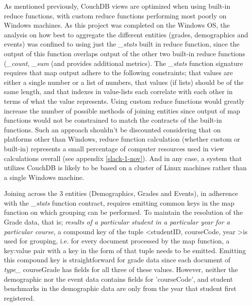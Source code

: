 As mentioned previously, CouchDB views are optimized when using built-in reduce functions, with custom reduce functions performing most poorly on Windows machines. As this project was completed on the Windows OS, the analysis on how best to aggregate the different entities (grades, demographics and events) was confined to using just the \textit{\_stats} built in reduce function, since the output of this function overlaps output of the other two built-in reduce functions (\textit{\_count}, \textit{\_sum} (and provides additional metrics). The \textit{\_stats} function signature requires that map output adhere to the following constraints; that values are either a single number or a list of numbers, that values (if lists) should be of the same length, and that indexes in value-lists each correlate with each other in terms of what the value represents. Using custom reduce functions would greatly increase the number of possible methods of joining entities since output of map functions would not be constrained to match the contracts of the built-in functions. Such an approach shouldn't be discounted considering that on platforms other than Windows, reduce function calculation (whether custom or built-in) represents a small percentage of computer resources used in view calculations overall (see appendix \ref{slack-1-nov}). And in any case, a system that utilizes CouchDB is likely to be based on a cluster of Linux machines rather than a single Windows machine.

Joining across the 3 entities (Demographics, Grades and Events), in adherence with the \textit{\_stats} function contract, requires emitting common keys in the map function on which grouping can be performed. To maintain the resolution of the Grade data, that is; \textit{results of a particular student in a particular year for a particular course}, a compound key of the tuple \textless studentID, courseCode, year \textgreater is used for grouping, i.e. for every document processed by the map function, a key:value pair with a key in the form of that tuple needs to be emitted. Emitting this compound key is straightforward for grade data since each document of \textit{type\_} courseGrade has fields for all three of these values. However, neither the demographic nor the event data contains fields for 'courseCode', and student benchmarks in the demographic data are only from the year that student first registered.

